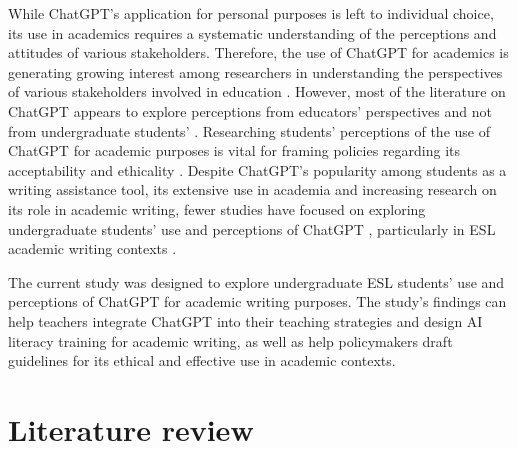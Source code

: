 \documentclass[english]{textolivre}
\begin{document}
While ChatGPT’s application for personal purposes is left to individual choice, its use in academics requires a systematic understanding of the perceptions and attitudes of various stakeholders. Therefore, the use of ChatGPT for academics is generating growing interest among researchers in understanding the perspectives of various stakeholders involved in education \cite{abusaaleek2024, shoufan2023}. However, most of the literature on ChatGPT appears to explore perceptions from educators’ perspectives and not from undergraduate students’ \cite{chellappa2024}. Researching students’ perceptions of the use of ChatGPT for academic purposes is vital for framing policies regarding its acceptability and ethicality \cite{mogavi2024, teng2024b, zou2023}. Despite ChatGPT’s popularity among students as a writing assistance tool, its extensive use in academia and increasing research on its role in academic writing, fewer studies have focused on exploring undergraduate students’ use and perceptions of ChatGPT \cite{chellappa2024, shoufan2023}, particularly in ESL academic writing contexts \cite{bekturova2025}.

The current study was designed to explore undergraduate ESL students’ use and perceptions of ChatGPT for academic writing purposes. The study’s findings can help teachers integrate ChatGPT into their teaching strategies and design AI literacy training for academic writing, as well as help policymakers draft guidelines for its ethical and effective use in academic contexts.

\section{Literature review}
\end{document}
